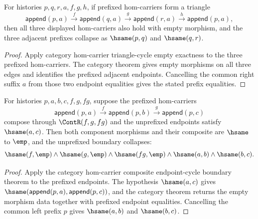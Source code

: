 \begin{theorem}
\label{thm:functor-prefix-triangle-cycle-empty-components}
For histories $p,q,r,a,f,g,h$, if prefixed hom-carriers form a triangle
$$
\mathsf{append}(p,a)\xrightarrow{f}\mathsf{append}(q,a)
\xrightarrow{g}\mathsf{append}(r,a)
\xrightarrow{h}\mathsf{append}(p,a),
$$
then all three displayed hom-carriers also hold with empty morphism, and the
three adjacent prefixes collapse as $\hsame(p,q)$ and $\hsame(q,r)$.
\end{theorem}
\begin{proof}
Apply category hom-carrier triangle-cycle empty exactness to the three
prefixed hom-carriers. The category theorem gives empty morphisms on all three
edges and identifies the prefixed adjacent endpoints. Cancelling the common
right suffix $a$ from those two endpoint equalities gives the stated prefix
equalities.
\end{proof}

\begin{theorem}
\label{thm:functor-prefix-hom-carrier-comp-endpoint-cycle-boundary-components}
For histories $p,a,b,c,f,g,fg$, suppose the prefixed hom-carriers
$$
\mathsf{append}(p,a)\xrightarrow{f}\mathsf{append}(p,b)
\xrightarrow{g}\mathsf{append}(p,c)
$$
compose through $\ContR(f,g,fg)$ and the unprefixed endpoints satisfy
$\hsame(a,c)$. Then both component morphisms and their composite are
$\hsame$ to $\emp$, and the unprefixed boundary collapses:
$$
\hsame(f,\emp)\land \hsame(g,\emp)\land \hsame(fg,\emp)\land
\hsame(a,b)\land\hsame(b,c).
$$
\end{theorem}
\begin{proof}
Apply the category hom-carrier composite endpoint-cycle boundary theorem to
the prefixed endpoints. The hypothesis $\hsame(a,c)$ gives
$\hsame(\mathsf{append}(p,a),\mathsf{append}(p,c))$, and the category theorem
returns the empty morphism data together with prefixed endpoint equalities.
Cancelling the common left prefix $p$ gives $\hsame(a,b)$ and $\hsame(b,c)$.
\end{proof}
